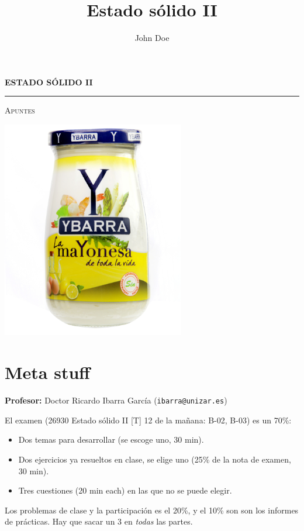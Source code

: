 \documentclass{tufte-book}
\title{Estado sólido II}
\author{John Doe}
\begin{document}
\begin{titlepage}
  \begin{fullwidth}
    \centering
    {\bfseries\Huge ESTADO SÓLIDO II\par}
    \vspace{0.7cm}
    \hrule
    \vspace{1cm}
    {\scshape\LARGE Apuntes \par}
    \vspace{5cm}
    \includegraphics[width=0.6\textwidth]{figures/ybarra.jpg}
    \vfill
  \end{fullwidth}
\end{titlepage}

\tableofcontents

\newpage

\section{Meta stuff}

\textbf{Profesor:} Doctor Ricardo Ibarra García (\verb~ibarra@unizar.es~)

El examen (26930 Estado sólido II [T] 12 de la mañana: B-02, B-03) es un 70\%:
\begin{itemize}
\item Dos temas para desarrollar (se escoge uno, 30 min).
\item Dos ejercicios ya resueltos en clase, se elige uno (25\% de la
nota de examen, 30 min).
\item Tres cuestiones (20 min each) en las que no se puede elegir.
\end{itemize}
Los problemas de clase y la participación es el 20\%, y el 10\% son
son los informes de prácticas. Hay que sacar un 3 en \emph{todas} las partes.
\end{document}
